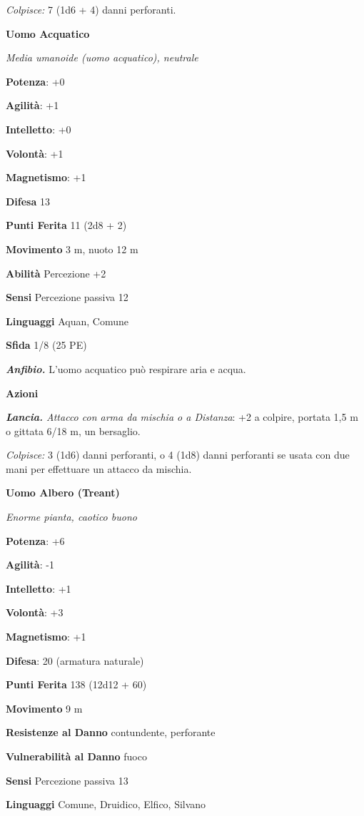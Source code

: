 \begin{multicols}{2}
\emph{Colpisce:} 7 (1d6 + 4) danni perforanti.

\textbf{Uomo Acquatico}

\emph{Media umanoide (uomo acquatico), neutrale}

\textbf{Potenza}: +0

\textbf{Agilità}: +1

\textbf{Intelletto}: +0

\textbf{Volontà}: +1

\textbf{Magnetismo}: +1

\textbf{Difesa} 13

\textbf{Punti Ferita} 11 (2d8 + 2)

\textbf{Movimento} 3 m, nuoto 12 m

\textbf{Abilità} Percezione +2

\textbf{Sensi} Percezione passiva 12

\textbf{Linguaggi} Aquan, Comune

\textbf{Sfida} 1/8 (25 PE)

\emph{\textbf{Anfibio.}} L'uomo acquatico può respirare aria e acqua.

\textbf{Azioni}

\emph{\textbf{Lancia.} Attacco con arma da mischia o a Distanza}: +2 a
colpire, portata 1,5 m o gittata 6/18 m, un bersaglio.

\emph{Colpisce:} 3 (1d6) danni perforanti, o 4 (1d8) danni perforanti se
usata con due mani per effettuare un attacco da mischia.

\textbf{Uomo Albero (Treant)}

\emph{Enorme pianta, caotico buono}

\textbf{Potenza}: +6

\textbf{Agilità}: -1

\textbf{Intelletto}: +1

\textbf{Volontà}: +3

\textbf{Magnetismo}: +1

\textbf{Difesa}: 20 (armatura naturale)

\textbf{Punti Ferita} 138 (12d12 + 60)

\textbf{Movimento} 9 m

\textbf{Resistenze al Danno} contundente, perforante

\textbf{Vulnerabilità al Danno} fuoco

\textbf{Sensi} Percezione passiva 13

\textbf{Linguaggi} Comune, Druidico, Elfico, Silvano


\end{multicols}
